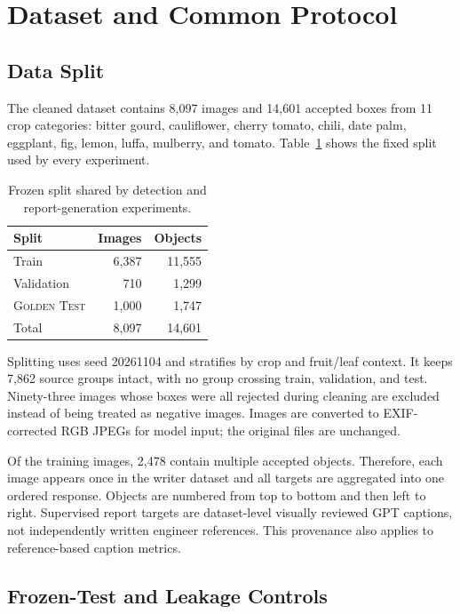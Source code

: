 \documentclass[11pt]{article}
\newcommand{\gold}{\textsc{Golden Test}}
\begin{document}
\section{Dataset and Common Protocol}

\subsection{Data Split}

The cleaned dataset contains 8,097 images and 14,601 accepted boxes from 11 crop
categories: bitter gourd, cauliflower, cherry tomato, chili, date palm,
eggplant, fig, lemon, luffa, mulberry, and tomato. Table~\ref{tab:data} shows the
fixed split used by every experiment.

\begin{table}[H]
\centering
\small
\begin{tabular}{lrr}
\toprule
Split & Images & Objects \\
\midrule
Train & 6,387 & 11,555 \\
Validation & 710 & 1,299 \\
\gold & 1,000 & 1,747 \\
\midrule
Total & 8,097 & 14,601 \\
\bottomrule
\end{tabular}
\caption{Frozen split shared by detection and report-generation experiments.}
\label{tab:data}
\end{table}

Splitting uses seed 20261104 and stratifies by crop and fruit/leaf context. It
keeps 7,862 source groups intact, with no group crossing train, validation, and
test. Ninety-three images whose boxes were all rejected during cleaning are
excluded instead of being treated as negative images. Images are converted to
EXIF-corrected RGB JPEGs for model input; the original files are unchanged.

Of the training images, 2,478 contain multiple accepted objects. Therefore, each
image appears once in the writer dataset and all targets are aggregated into one
ordered response. Objects are numbered from top to bottom and then left to
right. Supervised report targets are dataset-level visually reviewed GPT
captions, not independently written engineer references. This provenance also
applies to reference-based caption metrics.

\subsection{Frozen-Test and Leakage Controls}
\end{document}
